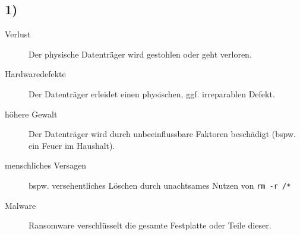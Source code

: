 \documentclass[ngerman]{fbi-aufgabenblatt}
\begin{document}
	\setcounter{section}{0}


	\subsection*{1)}
	\begin{description}
	\item [Verlust] Der physische Datenträger wird gestohlen oder geht verloren.
	\item [Hardwaredefekte] Der Datenträger erleidet einen physischen, ggf. irreparablen Defekt.
	\item [höhere Gewalt] Der Datenträger wird durch unbeeinflussbare Faktoren beschädigt (bspw. ein Feuer im Haushalt).
	\item [menschliches Versagen] bspw. versehentliches Löschen durch unachtsames Nutzen von \texttt{rm -r /*}
	\item[Malware] Ransomware verschlüsselt die gesamte Festplatte oder Teile dieser.
	\end{description} 
\end{document}
